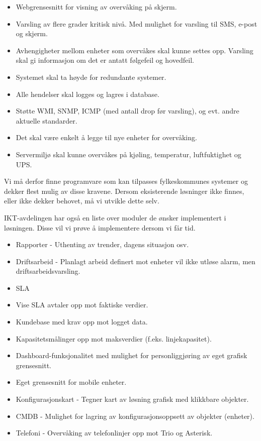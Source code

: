 \begin{itemize}
	\item Webgrensesnitt for visning av overvåking på skjerm.
	\item Varsling av flere grader kritisk nivå. Med mulighet for varsling til SMS, e-post og skjerm.
	\item Avhengigheter mellom enheter som overvåkes skal kunne settes opp. Varsling skal gi informasjon om det er antatt følgefeil og hovedfeil.
	\item Systemet skal ta høyde for redundante systemer.
	\item Alle hendelser skal logges og lagres i database.
	\item Støtte WMI, SNMP, ICMP (med antall drop før varsling), og evt. andre aktuelle standarder.
	\item Det skal være enkelt å legge til nye enheter for overvåking.
	\item Servermiljø skal kunne overvåkes på kjøling, temperatur, luftfuktighet og UPS.
\end{itemize}

Vi må derfor finne programvare som kan tilpasses fylkeskommunes systemer og dekker flest mulig av disse kravene. Dersom eksisterende løsninger ikke finnes, eller ikke dekker behovet, må vi utvikle dette selv.

IKT-avdelingen har også en liste over moduler de ønsker implementert i løsningen. Disse vil vi prøve å implementere dersom vi får tid.

\begin{itemize}
	\item Rapporter - Uthenting av trender, dagens situasjon osv.
	\item Driftsarbeid - Planlagt arbeid definert mot enheter vil ikke utløse alarm, men driftsarbeidsvarsling.
	\item SLA
	\item Vise SLA avtaler opp mot faktiske verdier.
	\item Kundebase med krav opp mot logget data.
	\item Kapasitetsmålinger opp mot maksverdier (f.eks. linjekapasitet).
	\item Dashboard-funksjonalitet med mulighet for personliggjøring av eget grafisk grensesnitt.
	\item Eget grensesnitt for mobile enheter.
	\item Konfigurasjonskart - Tegner kart av løsning grafisk med klikkbare objekter.
	\item CMDB - Mulighet for lagring av konfigurasjonsoppsett av objekter (enheter).
	\item Telefoni - Overvåking av telefonlinjer opp mot Trio og Asterisk.
\end{itemize}

